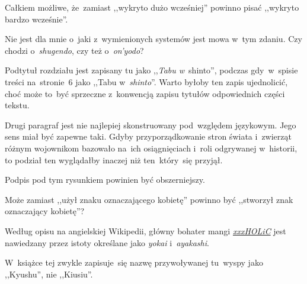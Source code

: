 \documentclass[a4paper,11pt]{article}
\begin{document}
\start {} Całkiem możliwe, że~zamiast ,,wykryto dużo
wcześniej'' powinno pisać ,,wykryto bardzo wcześnie''.

\vspace{\spaceFour}


\start {} Nie jest dla mnie o~jaki z~wymienionych systemów
jest mowa w~tym zdaniu. Czy chodzi o~\emph{shugendo}, %
czy też o~\emph{on'yodo}? %

\vspace{\spaceFour}


\start {} Podtytuł rozdziału jest zapisany tu jako ,,\emph{Tabu
  w}~shinto'', %
podczas gdy~w~spisie treści na~stronie~6 jako ,,Tabu
w~\emph{shinto}''. %
Warto byłoby ten zapis ujednolicić, choć może to~być sprzeczne
z~konwencją zapisu tytułów odpowiednich części tekstu.

\vspace{\spaceFour}


\start {} Drugi paragraf jest nie najlepiej skonstruowany
pod~względem językowym. Jego sens miał być zapewne taki. Gdyby
przyporządkowanie stron świata i~zwierząt różnym wojownikom bazowało
na~ich osiągnięciach i~roli odgrywanej w~historii, to podział ten
wyglądałby inaczej niż ten~który~się przyjął.

\vspace{\spaceFour}


\start {} Podpis pod tym rysunkiem powinien być obszerniejszy.

\vspace{\spaceFour}


\start {} Może zamiast ,,użył znaku oznaczającego
kobietę'' powinno być ,,stworzył znak oznaczający kobietę''?

\vspace{\spaceFour}


\start {} Według opisu na angielskiej Wikipedii, główny
bohater mangi
\href{https://en.wikipedia.org/wiki/XxxHolic}{\emph{xxxHOLiC}} jest
nawiedzany przez istoty określane jako \emph{yokai}
i~\emph{ayakashi}.

\vspace{\spaceFour}


\start {} W~książce tej zwykle zapisuje~się nazwę przywoływanej
tu~wyspy jako ,,Kyushu'', %
nie ,,Kiusiu''.
\end{document}
